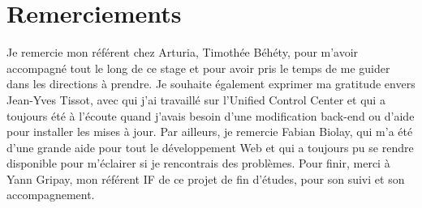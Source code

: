 \documentclass[francais]{rapportPFE}  %
\begin{document}
\newpage
\section{Remerciements}

Je remercie mon référent chez Arturia, Timothée Béhéty, pour m'avoir accompagné tout le long de ce stage et pour avoir pris le temps de me guider dans les directions à prendre. Je souhaite également exprimer ma gratitude envers Jean-Yves Tissot, avec qui j'ai travaillé sur l'Unified Control Center et qui a toujours été à l'écoute quand j'avais besoin d'une modification back-end ou d'aide pour installer les mises à jour. Par ailleurs, je remercie Fabian Biolay, qui m'a été d'une grande aide pour tout le développement Web et qui a toujours pu se rendre disponible pour m'éclairer si je rencontrais des problèmes. Pour finir, merci à Yann Gripay, mon référent IF de ce projet de fin d'études, pour son suivi et son accompagnement.
\newpage



\renewcommand\refname{Bibliographie}

\end{document}
